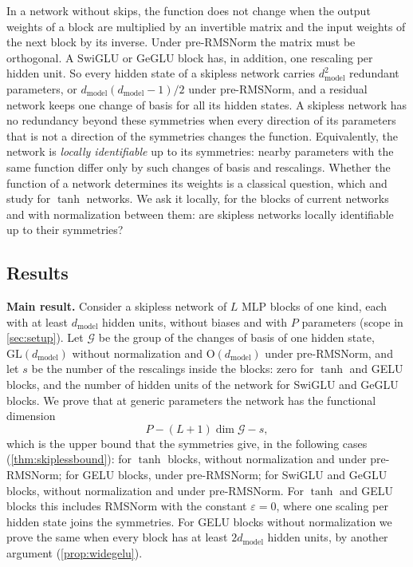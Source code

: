 \documentclass[10pt]{article}
\theoremstyle{definition}
\theoremstyle{remark}
\newcommand{\dm}{d_{\mathrm{model}}}
\newcommand{\GL}{\mathrm{GL}}
\newcommand{\Ort}{\mathrm{O}}
\newcommand{\G}{\mathcal{G}}
\newcommand{\para}[1]{\smallskip\noindent\textbf{#1}\hspace{0.5em}}
\begin{document}
In a network without skips, the function does not change when the output weights of a block are multiplied by an invertible matrix and the input weights of the next block by its inverse. Under pre-RMSNorm the matrix must be orthogonal. A SwiGLU or GeGLU block has, in addition, one rescaling per hidden unit. So every hidden state of a skipless network carries $\dm^2$ redundant parameters, or $\dm(\dm-1)/2$ under pre-RMSNorm, and a residual network keeps one change of basis for all its hidden states. A skipless network has no redundancy beyond these symmetries when every direction of its parameters that is not a direction of the symmetries changes the function. Equivalently, the network is \emph{locally identifiable} up to its symmetries: nearby parameters with the same function differ only by such changes of basis and rescalings. Whether the function of a network determines its weights is a classical question, which \citet{sussmann1992} and \citet{fefferman1994} study for $\tanh$ networks. We ask it locally, for the blocks of current networks and with normalization between them: are skipless networks locally identifiable up to their symmetries?

\subsection{Results}\label{sec:results-intro}

\para{Main result.} Consider a skipless network of $L$ MLP blocks of one kind, each with at least $\dm$ hidden units, without biases and with $P$ parameters (scope in \cref{sec:setup}). Let $\G$ be the group of the changes of basis of one hidden state, $\GL(\dm)$ without normalization and $\Ort(\dm)$ under pre-RMSNorm, and let $s$ be the number of the rescalings inside the blocks: zero for $\tanh$ and GELU blocks, and the number of hidden units of the network for SwiGLU and GeGLU blocks. We prove that at generic parameters the network has the functional dimension
\[
P - (L+1)\dim\G - s ,
\]
which is the upper bound that the symmetries give, in the following cases (\cref{thm:skiplessbound}): for $\tanh$ blocks, without normalization and under pre-RMSNorm; for GELU blocks, under pre-RMSNorm; for SwiGLU and GeGLU blocks, without normalization and under pre-RMSNorm. For $\tanh$ and GELU blocks this includes RMSNorm with the constant $\varepsilon = 0$, where one scaling per hidden state joins the symmetries. For GELU blocks without normalization we prove the same when every block has at least $2\dm$ hidden units, by another argument (\cref{prop:widegelu}).
\end{document}
